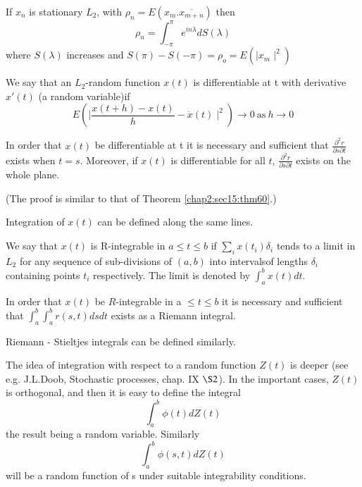 \begin{theorem}\label{chap2:sec15:thm62} %
  If $x_n$ is stationary $L_2$, with $\rho_n=E(x_m.\overline{x_{m+n}})$
  then
  $$ 
  \rho_n = \int^\pi_{-\pi} e^{in \lambda} dS(\lambda)
  $$
  where ${S(\lambda)}$ increases and ${S(\pi)-S(-\pi) = \rho_o = E
    (\mid x_m \mid^2)}$ 
  
  We say that an ${L_2}$-random function ${x(t)} $ is
  differentiable at t with derivative ${x'(t)}$ (a random variable)if  
  $$
  {E\left(\mid \frac{x(t+h)-x(t)}{h} - \dot{x}(t) \mid
    ^2\right)\rightarrow 0~\text{as}~h \rightarrow 0}
  $$
\end{theorem}

\begin{theorem} \label{chap2:sec15:thm63}%
  In order that $x(t)$ be differentiable at t it is necessary and
  sufficient that $\frac{\partial^2 r}{\partial s \partial t}$
  exists when $t = s$. Moreover, if $x(t)$ is differentiable for all
  $t$, $\frac{\partial^2 r}{\partial s \partial t}$ exists on the whole plane. 
  
  (The proof is similar to that of Theorem \ref{chap2:sec15:thm60}.)
  
  Integration of $x(t)$ can be defined along the same lines.
  
  We say that $x(t)$ is R-integrable in $a \leq t \leq
  b$ if $\sum_i  x (t_i) \delta_i $ tends
  to a limit in $L_2$ for any sequence of sub-divisions of
  $(a, b)$ into intervals\pageoriginale of lengths $\delta_i$
  containing points $t_i$ 
  respectively. The limit is denoted by $\int^b_a x(t) dt$. 
\end{theorem}

\begin{theorem}\label{chap2:sec15:thm64}
  In order that $x(t)$ be $R$-integrable
  in a $\leq t \leq  b$ it is necessary and sufficient that 
  $\int^b_a \int^b_a r(s, t)ds dt$ exists as a Riemann integral.
\end{theorem}

Riemann - Stieltjes integrals can be defined similarly.

The idea of integration with respect to a random function $Z(t)$ is
deeper (see e.g. J.L.Doob, Stochastic processes, chap. IX $\S 2$). In
the important cases, $Z(t)$ is orthogonal, and then it is easy to
define the integral 
$$
\int^b_a  \phi(t) dZ(t)
$$
the result being a random variable. Similarly 
$$
\int^b_a  \phi(s,t) dZ(t)
$$
will be a random function of s under suitable integrability conditions.

